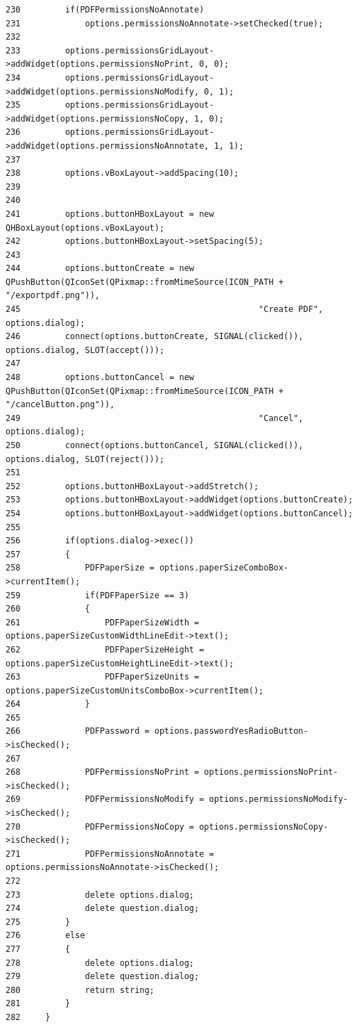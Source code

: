 \begin{verbatim}
230         if(PDFPermissionsNoAnnotate)
231             options.permissionsNoAnnotate->setChecked(true);
232 
233         options.permissionsGridLayout->addWidget(options.permissionsNoPrint, 0, 0);
234         options.permissionsGridLayout->addWidget(options.permissionsNoModify, 0, 1);
235         options.permissionsGridLayout->addWidget(options.permissionsNoCopy, 1, 0);
236         options.permissionsGridLayout->addWidget(options.permissionsNoAnnotate, 1, 1);
237 
238         options.vBoxLayout->addSpacing(10);
239 
240 
241         options.buttonHBoxLayout = new QHBoxLayout(options.vBoxLayout);
242         options.buttonHBoxLayout->setSpacing(5);
243 
244         options.buttonCreate = new QPushButton(QIconSet(QPixmap::fromMimeSource(ICON_PATH + "/exportpdf.png")),
245                                                "Create PDF", options.dialog);
246         connect(options.buttonCreate, SIGNAL(clicked()), options.dialog, SLOT(accept()));
247 
248         options.buttonCancel = new QPushButton(QIconSet(QPixmap::fromMimeSource(ICON_PATH + "/cancelButton.png")),
249                                                "Cancel", options.dialog);
250         connect(options.buttonCancel, SIGNAL(clicked()), options.dialog, SLOT(reject()));
251 
252         options.buttonHBoxLayout->addStretch();
253         options.buttonHBoxLayout->addWidget(options.buttonCreate);
254         options.buttonHBoxLayout->addWidget(options.buttonCancel);
255 
256         if(options.dialog->exec())
257         {
258             PDFPaperSize = options.paperSizeComboBox->currentItem();
259             if(PDFPaperSize == 3)
260             {
261                 PDFPaperSizeWidth = options.paperSizeCustomWidthLineEdit->text();
262                 PDFPaperSizeHeight = options.paperSizeCustomHeightLineEdit->text();
263                 PDFPaperSizeUnits = options.paperSizeCustomUnitsComboBox->currentItem();
264             }
265 
266             PDFPassword = options.passwordYesRadioButton->isChecked();
267 
268             PDFPermissionsNoPrint = options.permissionsNoPrint->isChecked();
269             PDFPermissionsNoModify = options.permissionsNoModify->isChecked();
270             PDFPermissionsNoCopy = options.permissionsNoCopy->isChecked();
271             PDFPermissionsNoAnnotate = options.permissionsNoAnnotate->isChecked();
272 
273             delete options.dialog;
274             delete question.dialog;
275         }
276         else
277         {
278             delete options.dialog;
279             delete question.dialog;
280             return string;
281         }
282     }

\end{verbatim}
